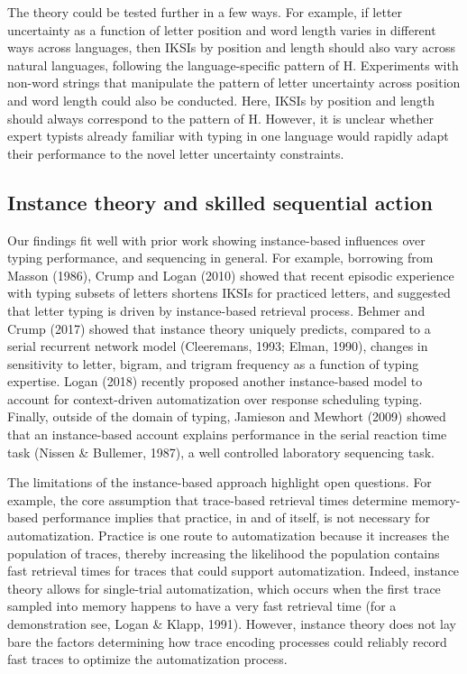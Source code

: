 \documentclass[,man,donotrepeattitle,floatsintext]{apa6}
\begin{document}
The theory could be tested further in a few ways. For example, if letter uncertainty as a function of letter position and word length varies in different ways across languages, then IKSIs by position and length should also vary across natural languages, following the language-specific pattern of H. Experiments with non-word strings that manipulate the pattern of letter uncertainty across position and word length could also be conducted. Here, IKSIs by position and length should always correspond to the pattern of H. However, it is unclear whether expert typists already familiar with typing in one language would rapidly adapt their performance to the novel letter uncertainty constraints.

\hypertarget{instance-theory-and-skilled-sequential-action}{%
\subsection{Instance theory and skilled sequential action}\label{instance-theory-and-skilled-sequential-action}}

Our findings fit well with prior work showing instance-based influences over typing performance, and sequencing in general. For example, borrowing from Masson (1986), Crump and Logan (2010) showed that recent episodic experience with typing subsets of letters shortens IKSIs for practiced letters, and suggested that letter typing is driven by instance-based retrieval process. Behmer and Crump (2017) showed that instance theory uniquely predicts, compared to a serial recurrent network model (Cleeremans, 1993; Elman, 1990), changes in sensitivity to letter, bigram, and trigram frequency as a function of typing expertise. Logan (2018) recently proposed another instance-based model to account for context-driven automatization over response scheduling typing. Finally, outside of the domain of typing, Jamieson and Mewhort (2009) showed that an instance-based account explains performance in the serial reaction time task (Nissen \& Bullemer, 1987), a well controlled laboratory sequencing task.

The limitations of the instance-based approach highlight open questions. For example, the core assumption that trace-based retrieval times determine memory-based performance implies that practice, in and of itself, is not necessary for automatization. Practice is one route to automatization because it increases the population of traces, thereby increasing the likelihood the population contains fast retrieval times for traces that could support automatization. Indeed, instance theory allows for single-trial automatization, which occurs when the first trace sampled into memory happens to have a very fast retrieval time (for a demonstration see, Logan \& Klapp, 1991). However, instance theory does not lay bare the factors determining how trace encoding processes could reliably record fast traces to optimize the automatization process.
\end{document}
